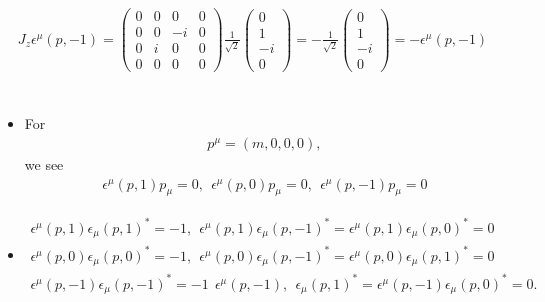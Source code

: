\documentclass[11pt]{article}
\def\eps{\epsilon}
\begin{document}
\begin{eqnarray}
    J_z \epsilon^\mu(p,-1)= 
    \begin{pmatrix}
        0 & 0 & 0 & 0 \\
        0 & 0 & -i & 0 \\
        0 & i & 0 & 0 \\
        0 & 0 & 0 & 0 
        \end{pmatrix}
        \frac{1}{\sqrt 2}
    \begin{pmatrix}
        0 \\ 1 \\ -i \\ 0
    \end{pmatrix}
    =
    -\frac{1}{\sqrt 2}
    \begin{pmatrix}
        0 \\ 1 \\ -i \\ 0
    \end{pmatrix}
    =-\epsilon^\mu(p,-1)
\end{eqnarray}

\section{ }
\begin{itemize}
    \item For 
    \begin{eqnarray}
    p^\mu = (m, 0, 0, 0),
    \end{eqnarray}
    we see
    \begin{eqnarray}
        \eps^\mu(p,1) p_\mu =0,~~\eps^\mu(p,0) p_\mu =0,~~\eps^\mu(p,-1) p_\mu =0
    \end{eqnarray}
    \item   
    \begin{eqnarray}
        \eps^\mu(p,1) \eps_\mu(p,1)^*=-1, ~~\eps^\mu(p,1) \eps_\mu(p,-1)^*=\eps^\mu(p,1) \eps_\mu(p,0)^*=0\\
        \eps^\mu(p,0) \eps_\mu(p,0)^*=-1, ~~\eps^\mu(p,0) \eps_\mu(p,-1)^*=\eps^\mu(p,0) \eps_\mu(p,1)^*=0\\
        \eps^\mu(p,-1) \eps_\mu(p,-1)^*=-1~~\eps^\mu(p,-1),~~ \eps_\mu(p,1)^*=\eps^\mu(p,-1) \eps_\mu(p,0)^*=0.
    \end{eqnarray}
\end{itemize}
\end{document}

